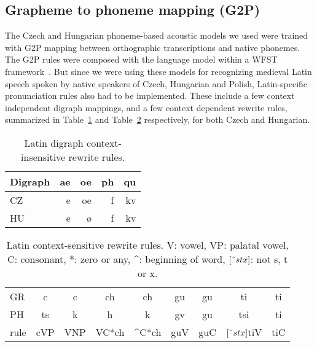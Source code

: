 \documentclass[runningheads,a4paper]{llncs}
\begin{document}
\subsection{Grapheme to phoneme mapping (G2P)}\label{g2p}
The Czech and Hungarian phoneme-based acoustic models we used were trained with G2P mapping between orthographic transcriptions and native phonemes.
The G2P rules were composed with the language model within a WFST framework~\cite{wfst}.
But since we were using these models for recognizing medieval Latin speech spoken by native speakers of Czech, Hungarian and Polish, Latin-specific pronunciation rules also had to be implemented. 
These include a few context independent digraph mappings, and a few context dependent rewrite rules, summarized in Table~\ref{tbl:digraph} and Table~\ref{tbl:context} respectively, for both Czech and Hungarian.

\begin{table}\label{tbl:digraph}
	\centering
	\caption{Latin digraph context-insensitive rewrite rules.}
	\begin{tabular}{l|rrrr}
	\hline
	Digraph & ae & oe & ph & qu \\
	\hline
	CZ & e & oe & f & kv \\
	HU & e & \o & f & kv \\
	\hline
	\end{tabular}
\end{table}

\begin{table}\label{tbl:context}
	\centering
	\caption{Latin context-sensitive rewrite rules. V: vowel, VP: palatal vowel, C: consonant, $*$: zero or any, \string^: beginning of word, $[\string^stx]$: not s, t or x.}
	\begin{tabular}{l|cc|cc|cc|cc}
	\hline
	GR & c & c & ch & ch & gu & gu & ti & ti \\
	PH & ts & k & h & k & gv & gu & tsi & ti \\
	\hline
	rule & \multicolumn{1}{c|}{cVP} & \multicolumn{1}{c|}{VNP} & \multicolumn{1}{c|}{VC*ch} & \multicolumn{1}{c|}{\string^C*ch} & \multicolumn{1}{c|}{guV} & \multicolumn{1}{c|}{guC} & \multicolumn{1}{c|}{$[\string^stx]$tiV} & \multicolumn{1}{c|}{tiC} \\
	\hline
	\end{tabular}
\end{table}
\end{document}

